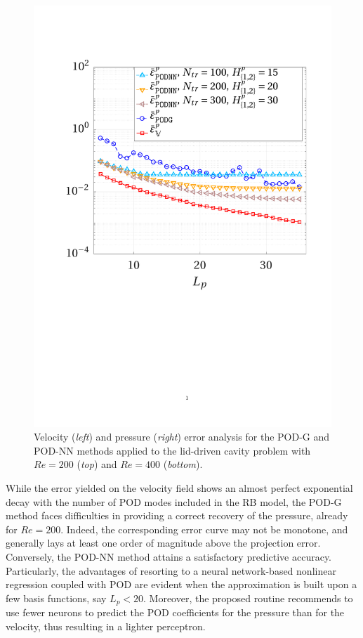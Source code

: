 \documentclass{elsarticle}
\numberwithin{equation}{section}
\theoremstyle{theorem}
\theoremstyle{definition}
\theoremstyle{remark}
\theoremstyle{proposition}
\numberwithin{figure}{section}
\begin{document}
\begin{figure}[t!]
			\includegraphics[scale = 0.38, trim = {2cm 9cm 1.5cm 3.5cm}, clip]{dc_400_p_error_vs_rank_ter}
			
			\caption{Velocity (\emph{left}) and pressure (\emph{right}) error analysis for the POD-G and POD-NN methods applied to the lid-driven cavity problem with $Re = 200$ (\emph{top}) and $Re = 400$ (\emph{bottom}).}
			\label{fig:dc-error-vs-rank}
		\end{figure}
		While the error yielded on the velocity field shows an almost perfect exponential decay with the number of POD modes included in the RB model, the POD-G method faces difficulties in providing a correct recovery of the pressure, already for $Re = 200$. Indeed, the corresponding error curve may not be monotone, and generally lays at least one order of magnitude above the projection error. Conversely, the POD-NN method attains a satisfactory predictive accuracy. Particularly, the advantages of resorting to a neural network-based nonlinear regression coupled with POD are evident when the approximation is built upon a few basis functions, say $L_p < 20$. %
		Moreover, the proposed routine recommends to use fewer neurons to predict the POD coefficients for the pressure than for the velocity, thus resulting in a lighter perceptron. 
		
\end{document}
